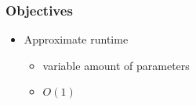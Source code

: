 \begin{frame}
	\frametitle{Objectives}
		\begin{itemize}
			\pause			
			\item {Approximate runtime}
			\begin{itemize}
				\pause
				\item {variable amount of parameters}
				\pause
				\item {$O(1)$}
			\end{itemize}
				
		\end{itemize}
\end{frame}		
		


